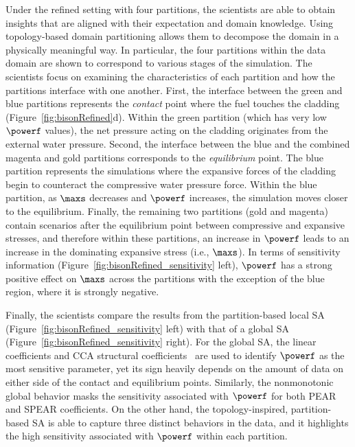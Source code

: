 Under the refined setting with four partitions, the scientists are able to obtain insights that are aligned with their expectation and domain knowledge.
%
Using topology-based domain partitioning allows them to decompose the domain in a physically meaningful way.
%
In particular, the four partitions within the data domain are shown to correspond to various stages of the simulation.
%
The scientists focus on examining the characteristics of each partition and how the partitions interface with one another.
%
First, the interface between the green and blue partitions represents the \emph{contact} point where the fuel touches the cladding (Figure~\ref{fig:bisonRefined}d).
%
Within the green partition (which has very low $\powerf$ values), the net pressure acting on the cladding originates from the external water pressure.
%
Second, the interface between the blue and the combined magenta and gold partitions corresponds to the \emph{equilibrium} point.
%
The blue partition represents the simulations where the expansive forces of the cladding begin to counteract the compressive water pressure force.
%
Within the blue partition, as $\maxs$ decreases and $\powerf$ increases, the simulation moves closer to the equilibrium.
%
Finally, the remaining two partitions (gold and magenta) contain scenarios after the equilibrium point between compressive and expansive stresses, and therefore within these partitions, an increase in $\powerf$ leads to an increase in the dominating expansive stress (i.e., $\maxs$).
%
In terms of sensitivity information (Figure~\ref{fig:bisonRefined_sensitivity} left), $\powerf$ has a strong positive effect on $\maxs$ across the partitions with the exception of the blue region, where it is strongly negative.

Finally, the scientists compare the results from the partition-based local SA (Figure~\ref{fig:bisonRefined_sensitivity} left) with that of a global SA (Figure~\ref{fig:bisonRefined_sensitivity} right).
%
For the global SA, the linear coefficients and CCA structural coefficients~\cite{CrossnoSheadSielicki2015} are used to identify $\powerf$ as the most sensitive parameter, yet its sign heavily depends on the amount of data on either side of the contact and equilibrium points.
%
Similarly, the nonmonotonic global behavior masks the sensitivity associated with $\powerf$ for both PEAR and SPEAR coefficients.
%
On the other hand, the topology-inspired, partition-based SA is able to capture three distinct behaviors in the data, and it highlights the high sensitivity associated with $\powerf$ within each partition.

